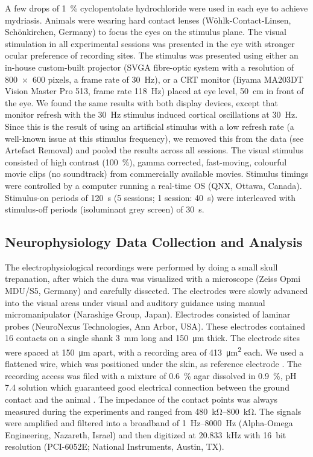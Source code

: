 A few drops of \SI{1}{\percent} cyclopentolate hydrochloride were used in each eye to achieve mydriasis.
Animals were wearing hard contact lenses (W\"ohlk-Contact-Linsen, Sch\"onkirchen, Germany) to focus the eyes on the stimulus plane.
The visual stimulation in all experimental sessions was presented in the eye with stronger ocular preference of recording sites.
The stimulus was presented using either an in-house custom-built projector (SVGA fibre-optic system with a resolution of \num{800x600} pixels, a frame rate of \SI{30}{Hz}), or a CRT monitor (Iiyama MA203DT Vision Master Pro 513, frame rate \SI{118}{Hz}) placed at eye level, \SI{50}{\centi\metre} in front of the eye.
We found the same results with both display devices, except that monitor refresh with the \SI{30}{Hz} stimulus induced cortical oscillations at \SI{30}{Hz}.
Since this is the result of using an artificial stimulus with a low refresh rate (a well-known issue at this stimulus frequency), we removed this from the data (see Artefact Removal) and pooled the results across all sessions.
The visual stimulus consisted of high contrast (\SI{100}{\percent}), gamma corrected, fast-moving, colourful movie clips (no soundtrack) from commercially available movies.
Stimulus timings were controlled by a computer running a real-time OS (QNX, Ottawa, Canada).
Stimulus-on periods of \SI{120}{\second} (\num{5} sessions; \num{1} session: \SI{40}{\second}) were interleaved with stimulus-off periods (isoluminant grey screen) of \SI{30}{\second}.


\subsection{Neurophysiology Data Collection and Analysis}

The electrophysiological recordings were performed by doing a small skull trepanation, after which the dura was visualized with a microscope (Zeiss Opmi MDU/S5, Germany) and carefully dissected.
The electrodes were slowly advanced into the visual areas under visual and auditory guidance using manual micromanipulator (Narashige Group, Japan).
Electrodes consisted of laminar probes (NeuroNexus Technologies, Ann Arbor, USA).
These electrodes contained \num{16} contacts on a single shank \SI{3}{\milli\metre} long and \SI{150}{\micro\metre} thick.
The electrode sites were spaced at \SI{150}{\micro\metre} apart, with a recording area of \SI{413}{\micro\metre^2} each.
We used a flattened  wire, which was positioned under the skin, as reference electrode \citep{Murayama2010}.
The recording access was filed with a mixture of \SI{0.6}{\percent} agar dissolved in  \SI{0.9}{\percent}, pH 7.4 solution which guaranteed good electrical connection between the ground contact and the animal \citep{Oeltermann2007760}.
The impedance of the contact points was always measured during the experiments and ranged from \SIrange{480}{800}{\kilo\ohm}.
The signals were amplified and filtered into a broadband of \SIrange{1}{8000}{Hz} (Alpha-Omega Engineering, Nazareth, Israel) and then digitized at \SI{20.833}{\kilo\Hz} with \SI{16}{bit} resolution (PCI-6052E; National Instruments, Austin, TX).


